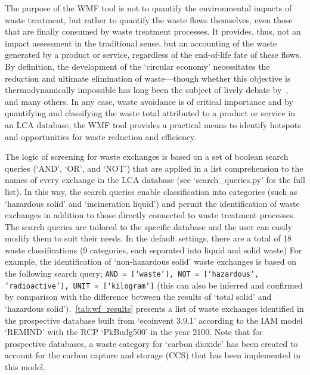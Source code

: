 The purpose of the WMF tool is not to quantify the environmental impacts of waste treatment, but rather to quantify the waste flows themselves, even those that are finally consumed by waste treatment processes. It provides, thus, not an impact assessment in the traditional sense, but an accounting of the waste generated by a product or service, regardless of the end-of-life fate of these flows. By definition, the development of the `circular economy' necessitates the reduction and ultimate elimination of waste---though whether this objective is thermodynamically impossible has long been the subject of lively debate by~\cite{ayres1998recycling},~\cite{reuter2012recyclinglimits} and many others. In any case, waste avoidance is of critical importance and by quantifying and classifying the waste total attributed to a product or service in an LCA database, the WMF tool provides a practical means to identify hotspots and opportunities for waste reduction and efficiency.

The logic of screening for waste exchanges is based on a set of boolean search queries (`AND', `OR', and `NOT') that are applied in a list comprehension to the names of every exchange in the LCA database (see `search\_queries.py' for the full list). In this way, the search queries enable classification into categories (such as `hazardous solid' and `incineration liquid') and permit the identification of waste exchanges in addition to those directly connected to waste treatment processes. The search queries are tailored to the specific database and the user can easily modify them to suit their needs. In the default settings, there are a total of 18 waste classifications (9 categories, each separated into liquid and solid waste) For example, the identification of `non-hazardous solid' waste exchanges is based on the following search query; \texttt{AND = [`waste'], NOT = [`hazardous', `radioactive'], UNIT = [`kilogram']} (this can also be inferred and confirmed by comparison with the difference between the results of `total solid' and `hazardous solid').\ \autoref{tab:wf_results} presents a list of waste exchanges identified in the prospective database built from `ecoinvent 3.9.1' according to the IAM model `REMIND' with the RCP `PkBudg500' in the year 2100. Note that for prospective databases, a waste category for `carbon dioxide' has been created to account for the carbon capture and storage (CCS) that has been implemented in this model. 

